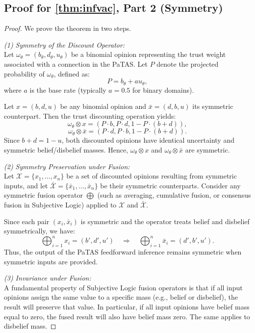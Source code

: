 \subsection{Proof for \cref{thm:infvac}, Part 2 (Symmetry)}
\begin{proof}
We prove the theorem in two steps.

\emph{(1) Symmetry of the Discount Operator:} \\
Let $\omega_\theta = (b_\theta, d_\theta, u_\theta)$ be a binomial opinion representing the trust weight associated with a connection in the PaTAS. Let $P$ denote the projected probability of $\omega_\theta$, defined as:
\[
P = b_\theta + a u_\theta,
\]
where $a$ is the base rate (typically $a = 0.5$ for binary domains).

Let $x = (b, d, u)$ be any binomial opinion and $\bar{x} = (d, b, u)$ its symmetric counterpart. Then the trust discounting operation yields:
\[
\omega_\theta \otimes x = (P \cdot b, P \cdot d, 1 - P \cdot (b + d)),
\]
\[
\omega_\theta \otimes \bar{x} = (P \cdot d, P \cdot b, 1 - P \cdot (b + d)).
\]
Since $b + d = 1 - u$, both discounted opinions have identical uncertainty and symmetric belief/disbelief masses. Hence, $\omega_\theta \otimes x$ and $\omega_\theta \otimes \bar{x}$ are symmetric.

\emph{(2) Symmetry Preservation under Fusion:} \\
Let $\mathcal{X} = \{x_1, \dots, x_n\}$ be a set of discounted opinions resulting from symmetric inputs, and let $\bar{\mathcal{X}} = \{\bar{x}_1, \dots, \bar{x}_n\}$ be their symmetric counterparts. Consider any symmetric fusion operator $\bigoplus$ (such as averaging, cumulative fusion, or consensus fusion in Subjective Logic) applied to $\mathcal{X}$ and $\bar{\mathcal{X}}$.

Since each pair $(x_i, \bar{x}_i)$ is symmetric and the operator treats belief and disbelief symmetrically, we have:
\[
\bigoplus_{i=1}^n x_i = (b', d', u') \quad \Rightarrow \quad \bigoplus_{i=1}^n \bar{x}_i = (d', b', u').
\]
Thus, the output of the PaTAS feedforward inference remains symmetric when symmetric inputs are provided.

\emph{(3) Invariance under Fusion:} \\
A fundamental property of Subjective Logic fusion operators is that if all input opinions assign the same value to a specific mass (e.g., belief or disbelief), the result will preserve that value. In particular, if all input opinions have belief mass equal to zero, the fused result will also have belief mass zero. The same applies to disbelief mass.


\end{proof}
